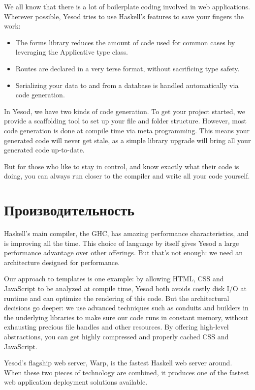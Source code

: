 We all know that there is a lot of boilerplate coding involved in web applications. Wherever possible, Yesod tries to use Haskell's features to save your fingers the work:

\begin{itemize}
  \item The forms library reduces the amount of code used for common cases by leveraging the Applicative type class.
  \item Routes are declared in a very terse format, without sacrificing type safety.
  \item Serializing your data to and from a database is handled automatically via code generation.
\end{itemize}

In Yesod, we have two kinds of code generation. To get your project started, we provide a scaffolding tool to set up your file and folder structure. However, most code generation is done at compile time via meta programming. This means your generated code will never get stale, as a simple library upgrade will bring all your generated code up-to-date.

But for those who like to stay in control, and know exactly what their code is doing, you can always run closer to the compiler and write all your code yourself.

\section{Производительность}

Haskell's main compiler, the GHC, has amazing performance characteristics, and is improving all the time. This choice of language by itself gives Yesod a large performance advantage over other offerings. But that's not enough: we need an architecture designed for performance.

Our approach to templates is one example: by allowing HTML, CSS and JavaScript to be analyzed at compile time, Yesod both avoids costly disk I/O at runtime and can optimize the rendering of this code. But the architectural decisions go deeper: we use advanced techniques such as conduits and builders in the underlying libraries to make sure our code runs in constant memory, without exhausting precious file handles and other resources. By offering high-level abstractions, you can get highly compressed and properly cached CSS and JavaScript.

Yesod's flagship web server, Warp, is the fastest Haskell web server around. When these two pieces of technology are combined, it produces one of the fastest web application deployment solutions available.

